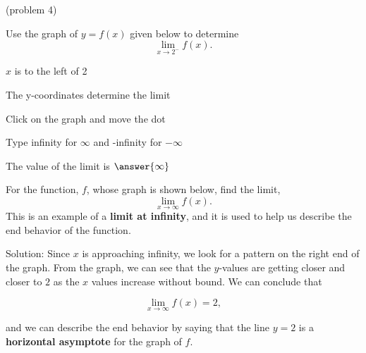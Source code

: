\documentclass[handout]{ximera}
\begin{document}
\begin{problem}(problem 4)

  Use the graph of $y = f(x)$ given below to determine
  \[
  \lim_{x\to 2^-} f(x).
  \]
  
    \begin{hint}
      $x$ is to the left of 2
    \end{hint}
    \begin{hint}
      The y-coordinates determine the limit
    \end{hint}
		\begin{hint}
		  Click on the graph and move the dot
		\end{hint}
		\begin{hint}
		 Type infinity for $\infty$ and -infinity for $-\infty$
		\end{hint}
		The value of the limit is
		 $\answer{\infty}$


	
\end{problem}

\begin{example}[example 5]
For the function, $f$, whose graph is shown below, find the limit,
\[
\lim_{x \to \infty}f(x).
\] 
This is an example of a \textbf{limit at infinity}, and it is used to help 
us describe the end behavior of the function.




\vspace{.25in}
Solution:  Since $x$ is approaching infinity, we look for a pattern on the right end of the graph.  
From the graph, we can see that the $y$-values are getting closer and closer to $2$ as the $x$ values 
increase without bound. We can conclude that 

\[
\lim_{x \to \infty}f(x) = 2,
\]

and we can describe the end behavior by saying that the line $y = 2$ is a \textbf{horizontal asymptote} for the graph of $f$.


\end{example}
\end{document}
